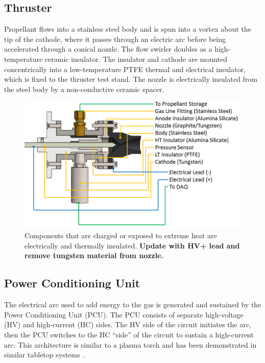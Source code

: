 \documentclass[journal]{IEEEtran}
\begin{document}
\subsection{Thruster}
Propellant flows into a stainless steel body and is spun into a vortex about the tip of the cathode, where it passes through an electric arc before being accelerated through a conical nozzle.
The flow swirler doubles as a high-temperature ceramic insulator.
The insulator and cathode are mounted concentrically into a low-temperature PTFE thermal and electrical insulator, which is fixed to the thruster test stand.
The nozzle is electrically insulated from the steel body by a non-conductive ceramic spacer.
\begin{figure}[htp]
  \centering
  \includegraphics[width=\linewidth]{figs/cutaway_annotated.png}
  \caption[P17101 Arcjet Annotated Cutaway]{Components that are charged or exposed to extreme heat are electrically and thermally insulated. \textbf{Update with HV+ lead and remove tungsten material from nozzle.}
\label{fig:annotated-cutaway}
}
\end{figure}

\subsection{Power Conditioning Unit}
The electrical arc used to add energy to the gas is generated and sustained by the Power Conditioning Unit (PCU).
The PCU consists of separate high-voltage (HV) and high-current (HC) sides.
The HV side of the circuit initiates the arc, then the PCU switches to the HC ``side'' of the circuit to sustain a high-current arc.
This architecture is similar to a plasma torch and has been demonstrated in similar tabletop systems~\cite{park2015thesis}.
\end{document}
